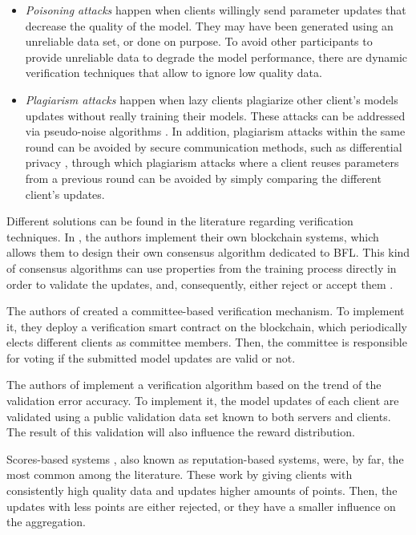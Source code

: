 \begin{itemize}
    \item \textit{Poisoning attacks} happen when clients willingly send parameter updates that decrease the quality of the model. They may have been generated using an unreliable data set, or done on purpose. To avoid other participants to provide unreliable data to degrade the model performance, there are dynamic verification techniques \cite{10.48550/arxiv.2110.02182, 10.48550/arxiv.2104.10501} that allow to ignore low quality data.
    
    \item \textit{Plagiarism attacks} happen when lazy clients plagiarize other client's models updates without really training their models. These attacks can be addressed via pseudo-noise algorithms \cite{9403374}. In addition, plagiarism attacks within the same round can be avoided by secure communication methods, such as differential privacy \cite{10.48550/arxiv.2009.09338}, through which plagiarism attacks where a client reuses parameters from a previous round can be avoided by simply comparing the different client's updates.
\end{itemize}

Different solutions can be found in the literature regarding verification techniques. In \cite{9293091, 10.1007/978-981-15-9213-3_12}, the authors implement their own blockchain systems, which allows them to design their own consensus algorithm dedicated to BFL. This kind of consensus algorithms can use properties from the training process directly in order to validate the updates, and, consequently, either reject or accept them \cite{9293091, 10.1007/978-981-15-9213-3_12}.
    
The authors of \cite{9159643} created a committee-based verification mechanism. To implement it, they deploy a verification smart contract on the blockchain, which periodically elects different clients as committee members. Then, the committee is responsible for voting if the submitted model updates are valid or not.

The authors of \cite{8945913} implement a verification algorithm based on the trend of the validation error accuracy. To implement it, the model updates of each client are validated using a public validation data set known to both servers and clients. The result of this validation will also influence the reward distribution.

Scores-based systems \cite{10.48550/arxiv.2011.07516, 9170559, Peyvandi2022, 9292450}, also known as reputation-based systems, were, by far, the most common among the literature. These work by giving clients with consistently high quality data and updates higher amounts of points. Then, the updates with less points are either rejected, or they have a smaller influence on the aggregation.

